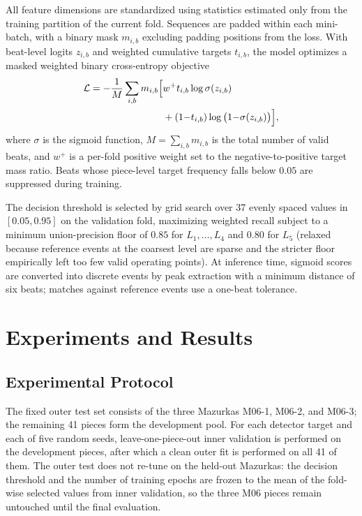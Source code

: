 \documentclass{article}
\begin{document}
All feature dimensions are standardized using statistics estimated only from the training partition of the current fold. Sequences are padded within each mini-batch, with a binary mask $m_{i,b}$ excluding padding positions from the loss. With beat-level logits $z_{i,b}$ and weighted cumulative targets $t_{i,b}$, the model optimizes a masked weighted binary cross-entropy objective
\begin{align}
\mathcal{L} = -\frac{1}{M}\sum_{i,b} m_{i,b}\Big[ &w^{+} t_{i,b} \log \sigma(z_{i,b}) \notag\\
&+ (1{-}t_{i,b}) \log\big(1{-}\sigma(z_{i,b})\big) \Big],
\end{align}
where $\sigma$ is the sigmoid function, $M = \sum_{i,b} m_{i,b}$ is the total number of valid beats, and $w^{+}$ is a per-fold positive weight set to the negative-to-positive target mass ratio. Beats whose piece-level target frequency falls below $0.05$ are suppressed during training.

The decision threshold is selected by grid search over 37 evenly spaced values in $[0.05, 0.95]$ on the validation fold, maximizing weighted recall subject to a minimum union-precision floor of $0.85$ for $L_1, \ldots, L_4$ and $0.80$ for $L_5$ (relaxed because reference events at the coarsest level are sparse and the stricter floor empirically left too few valid operating points). At inference time, sigmoid scores are converted into discrete events by peak extraction with a minimum distance of six beats; matches against reference events use a one-beat tolerance.

\section{Experiments and Results}\label{sec:experiments}

\subsection{Experimental Protocol}\label{subsec:protocol}

The fixed outer test set consists of the three Mazurkas M06-1, M06-2, and M06-3; the remaining 41 pieces form the development pool. For each detector target and each of five random seeds, leave-one-piece-out inner validation is performed on the development pieces, after which a clean outer fit is performed on all 41 of them. The outer test does not re-tune on the held-out Mazurkas: the decision threshold and the number of training epochs are frozen to the mean of the fold-wise selected values from inner validation, so the three M06 pieces remain untouched until the final evaluation.
\end{document}
